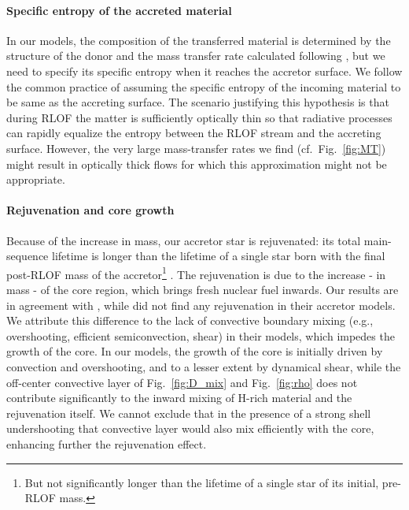 \documentclass[twocolumn,twocolappendix,trackchanges]{aastex63}
\DeclareRobustCommand{\Figref}[1]{Fig.~\ref{#1}}
\begin{document}
\paragraph{Specific entropy of the accreted material}
In our models, the composition of the transferred material is
determined by the structure of the donor and the mass transfer rate
calculated following \cite{kolb:90}, but we need to specify its
specific entropy when it reaches the accretor surface. We follow the
common practice of assuming the specific entropy of the incoming
material to be same as the accreting surface. The scenario justifying
this hypothesis is that during RLOF the matter is sufficiently
optically thin so that radiative processes can rapidly equalize the
entropy between the RLOF stream and the accreting surface. However,
the very large mass-transfer rates we find (cf.~\Figref{fig:MT}) might
result in optically thick flows for which this approximation might not
be appropriate.

\paragraph{Rejuvenation and core growth}
Because of the increase in mass, our accretor star is rejuvenated: its
total main-sequence lifetime is longer than the lifetime of a single
star born with the final post-RLOF mass of the accretor\footnote{But
  not significantly longer than the lifetime of a single star of its
  initial, pre-RLOF mass.}  \citep[e.g.,][]{schneider:16}. The
rejuvenation is due to the increase - in mass - of the core region,
which brings fresh nuclear fuel inwards. Our results are in agreement
with \cite{hellings:83}, while \cite{braun:95} did not find any
rejuvenation in their accretor models. We attribute this difference to
the lack of convective boundary mixing (e.g., overshooting, efficient
semiconvection, shear) in their models, which impedes the growth of
the core. In our models, the growth of the core is initially driven by
convection and overshooting, and to a lesser extent by dynamical
shear, while the off-center convective layer of \Figref{fig:D_mix} and
\Figref{fig:rho} does not contribute significantly to the inward
mixing of H-rich material and the rejuvenation itself. We cannot
exclude that in the presence of a strong shell undershooting that
convective layer would also mix efficiently with the core, enhancing
further the rejuvenation effect.
\end{document}
